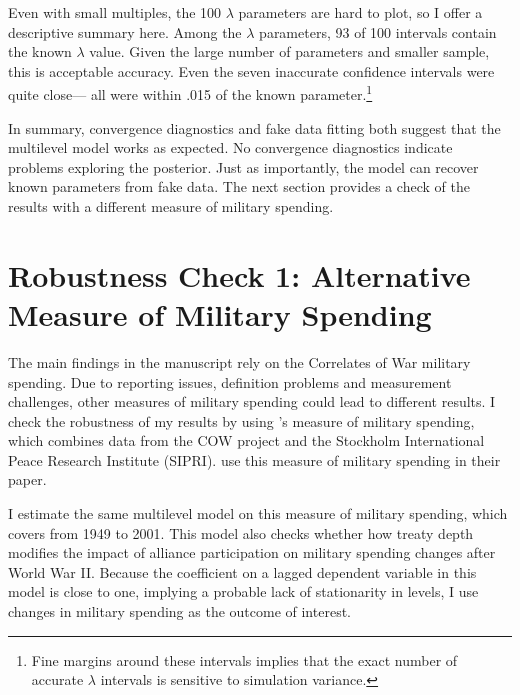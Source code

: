 \documentclass[12pt]{article}
\begin{document}
 
Even with small multiples, the 100 $\lambda$ parameters are hard to plot, so I offer a descriptive summary here. 
Among the $\lambda$ parameters, 93 of 100 intervals contain the known $\lambda$ value.
Given the large number of parameters and smaller sample, this is acceptable accuracy. 
Even the seven inaccurate confidence intervals were quite close--- all were within .015 of the known parameter.\footnote{Fine margins around these intervals implies that the exact number of accurate $\lambda$ intervals is sensitive to simulation variance.}


In summary, convergence diagnostics and fake data fitting both suggest that the multilevel model works as expected. 
No convergence diagnostics indicate problems exploring the posterior. 
Just as importantly, the model can recover known parameters from fake data. 
The next section provides a check of the results with a different measure of military spending. 




\section{Robustness Check 1: Alternative Measure of Military Spending}

The main findings in the manuscript rely on the Correlates of War military spending. 
Due to reporting issues, definition problems and measurement challenges, other measures of military spending could lead to different results. 
I check the robustness of my results by using \citet{Nordhausetal2012}'s measure of military spending, which combines data from the COW project and the Stockholm International Peace Research Institute (SIPRI). 
\citet{DigiuseppePoast2016} use this measure of military spending in their paper. 


I estimate the same multilevel model on this measure of military spending, which covers from 1949 to 2001. 
This model also checks whether how treaty depth modifies the impact of alliance participation on military spending changes after World War II.
Because the coefficient on a lagged dependent variable in this model is close to one, implying a probable lack of stationarity in levels, I use changes in military spending as the outcome of interest. 
\end{document}
